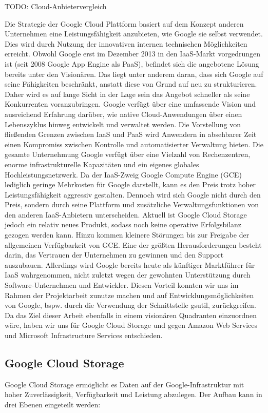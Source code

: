 \documentclass[13pt,a4paper,bibliography=totocnumbered,listof=totocnumbered]{scrartcl}
\begin{document}
TODO: Cloud-Anbietervergleich

Die Strategie der Google Cloud Plattform basiert auf dem Konzept anderen Unternehmen eine Leistungsfähigkeit anzubieten, wie Google sie selbst verwendet. Dies wird durch Nutzung der innovativen internen technischen Möglichkeiten erreicht. Obwohl Google erst im Dezember 2013 in den IaaS-Markt vorgedrungen ist (seit 2008 Google App Engine als PaaS), befindet sich die angebotene Lösung bereits unter den Visionären. Das liegt unter anderem daran, dass sich Google auf seine Fähigkeiten beschränkt, anstatt diese von Grund auf neu zu strukturieren. Daher wird es auf lange Sicht in der Lage sein das Angebot schneller als seine Konkurrenten voranzubringen. Google verfügt über eine umfassende Vision und ausreichend Erfahrung darüber, wie native Cloud-Anwendungen über einen Lebenszyklus hinweg entwickelt und verwaltet werden. Die Vorstellung von fließenden Grenzen zwischen IaaS und PaaS wird Anwendern in absehbarer Zeit einen Kompromiss zwischen Kontrolle und automatisierter Verwaltung bieten. Die gesamte Unternehmung Google verfügt über eine Vielzahl von Rechenzentren, enorme infrastrukturelle Kapazitäten und ein eigenes globales Hochleistungsnetzwerk. Da der IaaS-Zweig Google Compute Engine (GCE) lediglich geringe Mehrkosten für Google darstellt, kann es den Preis trotz hoher Leistungsfähigkeit aggressiv gestalten. Dennoch wird sich Google nicht durch den Preis, sondern durch seine Plattform und zusätzliche Verwaltungsfunktionen von den anderen IaaS-Anbietern unterscheiden. Aktuell ist Google Cloud Storage jedoch ein relativ neues Produkt, sodass noch keine operative Erfolgsbilanz gezogen werden kann. Hinzu kommen kleinere Störungen bis zur Freigabe der allgemeinen Verfügbarkeit von GCE. Eine der größten Herausforderungen besteht darin, das Vertrauen der Unternehmen zu gewinnen und den Support auszubauen. Allerdings wird Google bereits heute als künftiger Marktführer für IaaS wahrgenommen, nicht zuletzt wegen der gewohnten Unterstützung durch Software-Unternehmen und Entwickler. Diesen Vorteil konnten wir uns im Rahmen der Projektarbeit zunutze machen und auf Entwicklungsmöglichkeiten von Google, bspw. durch die Verwendung der Schnittstelle gsutil, zurückgreifen. Da das Ziel dieser Arbeit ebenfalls in einem visionären Quadranten einzuordnen wäre, haben wir uns für Google Cloud Storage und gegen Amazon Web Services und Microsoft Infrastructure Services entschieden.

\subsection{Google Cloud Storage}
Google Cloud Storage ermöglicht es Daten auf der Google-Infrastruktur mit hoher Zuverlässigkeit, Verfügbarkeit und Leistung abzulegen. Der Aufbau kann in drei Ebenen \cite{40} eingeteilt werden:
\end{document}
